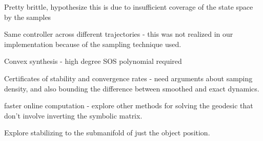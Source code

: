 \documentclass[journal]{IEEEtran}
\begin{document}
Pretty brittle, hypothesize this is due to insufficient coverage of the state space by the samples

Same controller across different trajectories - this was not realized in our implementation because of the sampling technique used.

Convex synthesis - high degree SOS polynomial required

Certificates of stability and convergence rates - need arguments about samping density, and also bounding the difference between smoothed and exact dynamics.

faster online computation - explore other methods for solving the geodesic that don't involve inverting the symbolic matrix.

Explore stabilizing to the submanifold of just the object position.

\printbibliography
\end{document}
